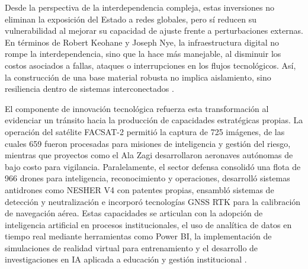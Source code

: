 Desde la perspectiva de la interdependencia compleja, estas inversiones no eliminan la exposición del Estado a redes globales, pero sí reducen su vulnerabilidad al mejorar su capacidad de ajuste frente a perturbaciones externas. En términos de Robert Keohane y Joseph Nye, la infraestructura digital no rompe la interdependencia, sino que la hace más manejable, al disminuir los costos asociados a fallas, ataques o interrupciones en los flujos tecnológicos. Así, la construcción de una base material robusta no implica aislamiento, sino resiliencia dentro de sistemas interconectados \parencite{keohane_nye_power_2011}.

El componente de innovación tecnológica refuerza esta transformación al evidenciar un tránsito hacia la producción de capacidades estratégicas propias. La operación del satélite FACSAT-2 permitió la captura de 725 imágenes, de las cuales 659 fueron procesadas para misiones de inteligencia y gestión del riesgo, mientras que proyectos como el Ala Zagi desarrollaron aeronaves autónomas de bajo costo para vigilancia. Paralelamente, el sector defensa consolidó una flota de 966 drones para inteligencia, reconocimiento y operaciones, desarrolló sistemas antidrones como NESHER V4 con patentes propias, ensambló sistemas de detección y neutralización e incorporó tecnologías GNSS RTK para la calibración de navegación aérea. Estas capacidades se articulan con la adopción de inteligencia artificial en procesos institucionales, el uso de analítica de datos en tiempo real mediante herramientas como Power BI, la implementación de simulaciones de realidad virtual para entrenamiento y el desarrollo de investigaciones en IA aplicada a educación y gestión institucional \parencite{fac_informe_rendicion_2023,mindefensa_audiencia_rendicion_2025,mindefensa_100_logros_2026}.


